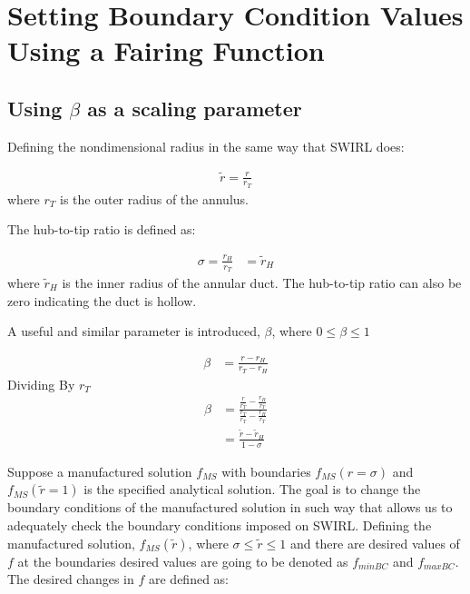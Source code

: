 
\section{Setting Boundary Condition Values Using a Fairing Function}

\subsection{Using $\beta$ as a scaling parameter}

Defining the nondimensional radius in the same way that SWIRL does:

\begin{align*}
    \widetilde{r} = \frac{r}{r_T}
\end{align*}
where $r_T$ is the outer radius of the annulus.

The hub-to-tip ratio is defined as:

\begin{align*}
    \sigma = \frac{r_H}{r_T}
     &= \widetilde{r}_H
\end{align*}
where $\widetilde{r}_H$ is the inner radius of the annular duct. The hub-to-tip
ratio can also be zero indicating the duct is hollow.

A useful and similar parameter is introduced, $\beta$, where $ 0 \leq \beta \leq 1$

\begin{align*}
    \beta &=
    \frac{r - r_H}{r_T - r_H}
\end{align*}
Dividing By $r_T$
\begin{align*}
    \beta &= 
    \frac{
        \frac{r}{r_T} - \frac{r_H}{r_T}
}{
        \frac{r_T}{r_T} - \frac{r_H}{r_T}
}\\
&= \frac{
    \widetilde{r} - \widetilde{r}_H
}{
1 - \sigma
}
\end{align*}

Suppose a manufactured solution $f_{MS}$ with boundaries $f_{MS}(r= \sigma)$ 
and $f_{MS}(\widetilde{r}= 1)$ is the specified analytical solution. The goal
is to change the boundary conditions of the manufactured solution in such  way 
that allows us to adequately check the boundary conditions imposed on SWIRL.
Defining the manufactured solution, $f_{MS}(\widetilde{r})$,   where
$\sigma \leq \widetilde{r} \leq 1$ and there are desired values of $f$ at the 
boundaries desired values are going to be denoted as $f_{minBC}$ and $f_{maxBC}$.
The desired changes in $f$ are defined as:

